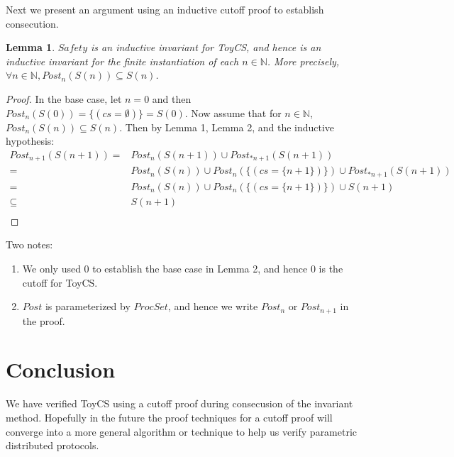 \documentclass[12pt]{article}
\newtheorem{lemma}{Lemma}
\begin{document}
Next we present an argument using an inductive cutoff proof to establish consecution.

\begin{lemma}
  $Safety$ is an inductive invariant for ToyCS, and hence is an inductive invariant for the finite instantiation of each $n \in \mathbb{N}$.  More precisely, $\forall n \in \mathbb{N}, Post_n(S(n)) \subseteq S(n)$.
\end{lemma}
\begin{proof}
  In the base case, let $n=0$ and then $Post_n(S(0)) = \{(cs = \emptyset)\} = S(0)$.  Now assume that for $n \in \mathbb{N}$, $Post_n(S(n)) \subseteq S(n)$.  Then by Lemma 1, Lemma 2, and the inductive hypothesis:
  \begin{align*}
    Post_{n+1}(S(n+1)) = &Post_n(S(n+1)) \cup Post_{*n+1}(S(n+1))\\
    = &Post_n(S(n)) \cup Post_n(\{(cs=\{n+1\})\}) \cup Post_{*n+1}(S(n+1))\\
    = &Post_n(S(n)) \cup Post_n(\{(cs=\{n+1\})\}) \cup S(n+1)\\
    \subseteq &S(n+1)\\
  \end{align*}
\end{proof}

Two notes:
\begin{enumerate}
  \item We only used 0 to establish the base case in Lemma 2, and hence 0 is the cutoff for ToyCS.
  \item $Post$ is parameterized by $ProcSet$, and hence we write $Post_n$ or $Post_{n+1}$ in the proof.
\end{enumerate}

\section{Conclusion}
We have verified ToyCS using a cutoff proof during consecusion of the invariant method.  Hopefully in the future the proof techniques for a cutoff proof will converge into a more general algorithm or technique to help us verify parametric distributed protocols.
\end{document}
